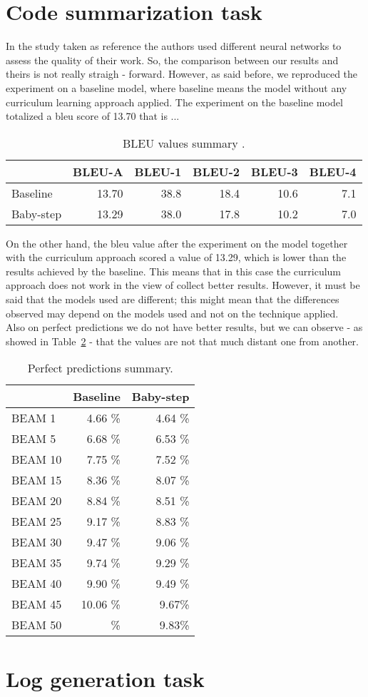 \section{Code summarization task}
In the study taken as reference the authors used different neural networks to 
assess the quality of their work. So, the comparison between our results and theirs
is not really straigh - forward. However, as said before, we reproduced the experiment on a baseline model,
where baseline means the model without any curriculum learning approach applied.
The experiment on the baseline model totalized a bleu score of 13.70 that is ...
\begin{table}[h!]
    \centering
    \begin{tabular}{l|r|r|r|r|r}
     & BLEU-A & BLEU-1 & BLEU-2 & BLEU-3 & BLEU-4\\ [0.5ex] 
     \hline
     Baseline & 13.70 & 38.8 & 18.4 & 10.6 & 7.1\\  
     Baby-step & 13.29 & 38.0 & 17.8 & 10.2 & 7.0\\ [1ex]
     \end{tabular}
    \caption{BLEU values summary .}
    \label{table:1}
    \end{table}
On the other hand, the bleu value after the experiment on the model together with the curriculum approach
scored a value of 13.29, which is lower than the results achieved by the baseline.
This means that in this case the curriculum approach does not work in the view of collect better results.
However, it must be said that the models used are different; this might mean that the differences observed
may depend on the models used and not on the technique applied.\\
Also on perfect predictions we do not have better results, but we can observe - as showed in Table~\ref{table:2} - that the values are not 
that much distant one from another.

\begin{table}[h!]
    \centering
    \begin{tabular}{l|r|r} 
    & Baseline & Baby-step\\ [0.5ex] 
    \hline
    BEAM 1 & 4.66 \% & 4.64 \%\\  
    BEAM 5 & 6.68 \% & 6.53 \% \\ 
    BEAM 10 & 7.75 \% & 7.52 \%\\
    BEAM 15 & 8.36 \% & 8.07 \%\\
    BEAM 20 & 8.84 \% & 8.51 \%\\
    BEAM 25 & 9.17 \% & 8.83 \%\\
    BEAM 30 & 9.47 \% & 9.06 \%\\
    BEAM 35 & 9.74 \% & 9.29 \%\\
    BEAM 40 & 9.90 \% & 9.49 \%\\
    BEAM 45 & 10.06 \%& 9.67\%\\
    BEAM 50 & \%& 9.83\%\\ [1ex]
    \end{tabular}
    \caption{Perfect predictions summary.}
    \label{table:2}
\end{table}
\section{Log generation task}